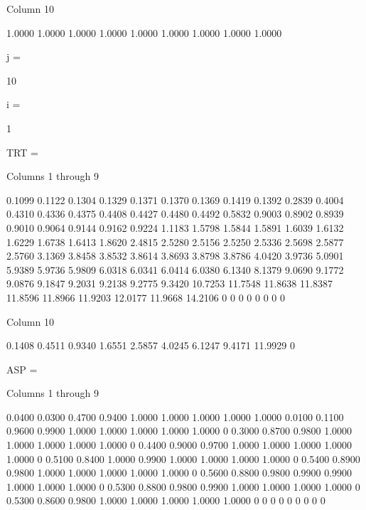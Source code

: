   Column 10

    1.0000
    1.0000
    1.0000
    1.0000
    1.0000
    1.0000
    1.0000
    1.0000
    1.0000


j =

    10


i =

     1


TRT =

  Columns 1 through 9

    0.1099    0.1122    0.1304    0.1329    0.1371    0.1370    0.1369    0.1419    0.1392
    0.2839    0.4004    0.4310    0.4336    0.4375    0.4408    0.4427    0.4480    0.4492
    0.5832    0.9003    0.8902    0.8939    0.9010    0.9064    0.9144    0.9162    0.9224
    1.1183    1.5798    1.5844    1.5891    1.6039    1.6132    1.6229    1.6738    1.6413
    1.8620    2.4815    2.5280    2.5156    2.5250    2.5336    2.5698    2.5877    2.5760
    3.1369    3.8458    3.8532    3.8614    3.8693    3.8798    3.8786    4.0420    3.9736
    5.0901    5.9389    5.9736    5.9809    6.0318    6.0341    6.0414    6.0380    6.1340
    8.1379    9.0690    9.1772    9.0876    9.1847    9.2031    9.2138    9.2775    9.3420
   10.7253   11.7548   11.8638   11.8387   11.8596   11.8966   11.9203   12.0177   11.9668
   14.2106         0         0         0         0         0         0         0         0

  Column 10

    0.1408
    0.4511
    0.9340
    1.6551
    2.5857
    4.0245
    6.1247
    9.4171
   11.9929
         0


ASP =

  Columns 1 through 9

    0.0400    0.0300    0.4700    0.9400    1.0000    1.0000    1.0000    1.0000    1.0000
    0.0100    0.1100    0.9600    0.9900    1.0000    1.0000    1.0000    1.0000    1.0000
         0    0.3000    0.8700    0.9800    1.0000    1.0000    1.0000    1.0000    1.0000
         0    0.4400    0.9000    0.9700    1.0000    1.0000    1.0000    1.0000    1.0000
         0    0.5100    0.8400    1.0000    0.9900    1.0000    1.0000    1.0000    1.0000
         0    0.5400    0.8900    0.9800    1.0000    1.0000    1.0000    1.0000    1.0000
         0    0.5600    0.8800    0.9800    0.9900    0.9900    1.0000    1.0000    1.0000
         0    0.5300    0.8800    0.9800    0.9900    1.0000    1.0000    1.0000    1.0000
         0    0.5300    0.8600    0.9800    1.0000    1.0000    1.0000    1.0000    1.0000
         0         0         0         0         0         0         0         0         0

